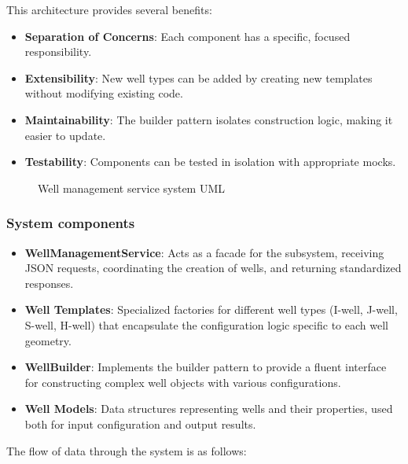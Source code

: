 This architecture provides several benefits:
\begin{itemize}
	\item \textbf{Separation of Concerns}: Each component has a specific, focused responsibility.
	\item \textbf{Extensibility}: New well types can be added by creating new templates without modifying existing code.
	\item \textbf{Maintainability}: The builder pattern isolates construction logic, making it easier to update.
	\item \textbf{Testability}: Components can be tested in isolation with appropriate mocks.
\end{itemize}

\begin{figure}[H]
	\centering
	
	\caption{Well management service system UML}
	\label{fig:WellManagementServiceUML}
\end{figure}


\subsubsection{System components}
\begin{itemize}
	\item \textbf{WellManagementService}: Acts as a facade for the subsystem, receiving JSON requests, coordinating the creation of wells, and returning standardized responses.

	\item \textbf{Well Templates}: Specialized factories for different well types (I-well, J-well, S-well, H-well) that encapsulate the configuration logic specific to each well geometry.

	\item \textbf{WellBuilder}: Implements the builder pattern to provide a fluent interface for constructing complex well objects with various configurations.

	\item \textbf{Well Models}: Data structures representing wells and their properties, used both for input configuration and output results.
\end{itemize}

The flow of data through the system is as follows:

